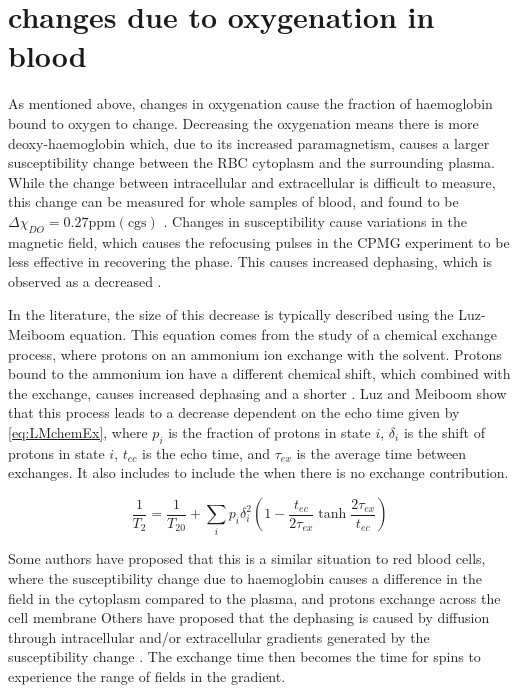 \section{\Ttwo changes due to oxygenation in blood}
\label{sec:back-T2SO2}
As mentioned above, changes in oxygenation cause the fraction of haemoglobin bound to oxygen to change.
Decreasing the oxygenation means there is more deoxy-haemoglobin which, due to its increased paramagnetism, causes a larger susceptibility change between the RBC cytoplasm and the surrounding plasma.
While the change between intracellular and extracellular is difficult to measure, this change can be measured for whole samples of blood, and found to be $\Delta\chi_{DO} = 0.27 \mathrm{ppm  (cgs)}$ \cite{JainInvestigatingmagneticsusceptibility2012}.
Changes in susceptibility cause variations in the magnetic field, which causes the refocusing pulses in the CPMG experiment to be less effective in recovering the phase.
This causes increased dephasing, which is observed as a decreased \Ttwo.

In the literature, the size of this decrease is typically described using the Luz-Meiboom equation.
This equation comes from the study of a chemical exchange process, where protons on an ammonium ion exchange with the solvent\cite{LuzNuclearMagneticResonance1963}.
Protons bound to the ammonium ion have a different chemical shift, which combined with the exchange, causes increased dephasing and a shorter \Ttwo.
Luz and Meiboom show that this process leads to a \Ttwo decrease dependent on the echo time given by \autoref{eq:LMchemEx}\cite{LuzNuclearMagneticResonance1963}, where $p_i$ is the fraction of protons in state $i$, $\delta_i$ is the shift of protons in state $i$, $t_{ec}$ is the echo time, and $\tau_{ex}$ is the average time between exchanges. It also includes \TtwoO to include the \Ttwo when there is no exchange contribution.

\begin{equation}
\label{eq:LMchemEx}
\frac{1}{T_2} = \frac{1}{T_{20}} + \sum_i{p_i\delta_i^2} \left(1 - \frac{t_{ec}}{2\tau_{ex}} \tanh{ \frac{2\tau_{ex}}{t_{ec}} }\right)
\end{equation}

Some authors have proposed that this is a similar situation to red blood cells, where the susceptibility change due to haemoglobin causes a difference in the field in the cytoplasm compared to the plasma, and protons exchange across the cell membrane\cite{BryantMagneticrelaxationblood1990}
Others have proposed that the dephasing is caused by diffusion through intracellular and/or extracellular gradients generated by the susceptibility change \cite{GomoriNMRRelaxationTimes1987,BrooksComparisont2relaxation1995,BrooksT2shorteningweaklymagnetized2001}.
The exchange time then becomes the time for spins to experience the range of fields in the gradient.

